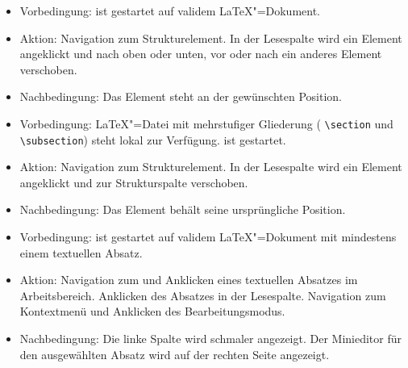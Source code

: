 \begin{itemize}
  \item Vorbedingung: \texla{} ist gestartet auf validem \LaTeX"=Dokument.
  \item Aktion: Navigation zum Strukturelement.
  In der Lesespalte wird ein Element angeklickt und nach oben oder unten, vor oder nach ein anderes Element
  verschoben.
  \item Nachbedingung: Das Element steht an der gewünschten Position.
\end{itemize}

\begin{itemize}
  \item Vorbedingung: \LaTeX"=Datei mit mehrstufiger Gliederung (\zB{} \verb|\section| und \verb|\subsection|) steht
  lokal zur Verfügung.
  \texla{} ist gestartet.
  \item Aktion: Navigation zum Strukturelement.
  In der Lesespalte wird ein Element angeklickt und zur Strukturspalte verschoben.
  \item Nachbedingung: Das Element behält seine ursprüngliche Position.
\end{itemize}

\begin{itemize}
  \item Vorbedingung: \texla{} ist gestartet auf validem \LaTeX"=Dokument mit mindestens einem textuellen Absatz.
  \item Aktion: Navigation zum und Anklicken eines textuellen Absatzes im Arbeitsbereich.
  Anklicken des Absatzes in der Lesespalte.
  Navigation zum Kontextmenü und Anklicken des Bearbeitungsmodus.
  \item Nachbedingung: Die linke Spalte wird schmaler angezeigt.
  Der Minieditor für den ausgewählten Absatz wird auf der rechten Seite angezeigt.
\end{itemize}

\clearpage

